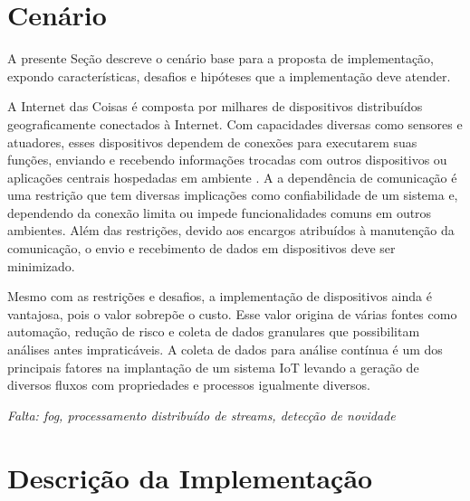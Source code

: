 
\section{Cenário}\label{sec:cenario}

A presente Seção descreve o cenário base para a proposta de implementação,
expondo características, desafios e hipóteses que a implementação deve atender.

A Internet das Coisas \iot é composta por milhares de dispositivos distribuídos
geograficamente conectados à Internet.
Com capacidades diversas como sensores e atuadores, esses dispositivos dependem
de conexões para executarem suas funções, enviando e recebendo informações
trocadas com outros dispositivos ou aplicações centrais hospedadas em ambiente
\cloud.
A a dependência de comunicação é uma restrição que tem diversas implicações
como confiabilidade de um sistema e, dependendo da conexão limita ou impede
funcionalidades comuns em outros ambientes.
Além das restrições, devido aos encargos atribuídos à manutenção da comunicação,
o envio e recebimento de dados em dispositivos deve ser minimizado.


Mesmo com as restrições e desafios, a implementação de dispositivos ainda é
vantajosa, pois o valor sobrepõe o custo.
Esse valor origina de várias fontes como automação, redução de risco e coleta
de dados granulares que possibilitam análises antes impraticáveis.
A coleta de dados para análise contínua é um dos principais fatores na
implantação de um sistema IoT levando a geração de diversos fluxos com
propriedades e processos igualmente diversos.


\textit{Falta: fog, processamento distribuído de streams, detecção de novidade}

\section{Descrição da Implementação}\label{sec:descricao}

\newcommand{\source}{\emph{source}\xspace}
\newcommand{\sink}{\emph{sink}\xspace}

